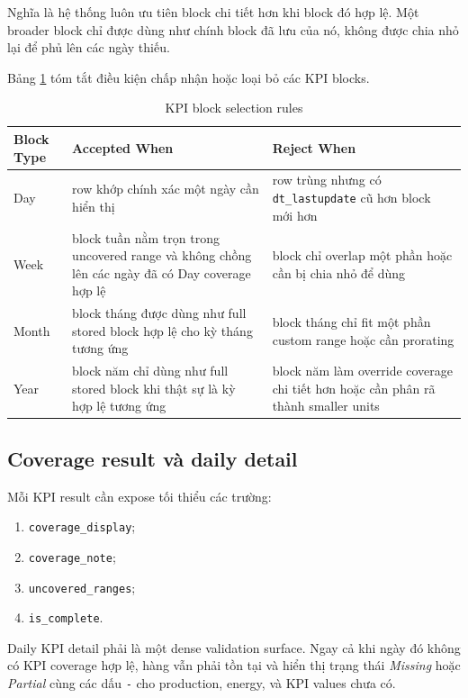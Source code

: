 Nghĩa là hệ thống luôn ưu tiên block chi tiết hơn khi block đó hợp lệ. Một broader block chỉ được dùng như chính block đã lưu của nó, không được chia nhỏ lại để phủ lên các ngày thiếu.

Bảng \ref{tab:kpi_block_rules} tóm tắt điều kiện chấp nhận hoặc loại bỏ các KPI blocks.

\begin{table}[htbp]
	\centering
	\renewcommand{\arraystretch}{1.3}
	\caption{KPI block selection rules}
	\label{tab:kpi_block_rules}
	\begin{tabularx}{\linewidth}{|>{\RaggedRight\arraybackslash}p{2.2cm}|>{\RaggedRight\arraybackslash}X|>{\RaggedRight\arraybackslash}X|}
		\hline
		\textbf{Block Type} & \textbf{Accepted When} & \textbf{Reject When} \\ \hline
		Day & row khớp chính xác một ngày cần hiển thị & row trùng nhưng có \texttt{dt\_lastupdate} cũ hơn block mới hơn \\ \hline
		Week & block tuần nằm trọn trong uncovered range và không chồng lên các ngày đã có Day coverage hợp lệ & block chỉ overlap một phần hoặc cần bị chia nhỏ để dùng \\ \hline
		Month & block tháng được dùng như full stored block hợp lệ cho kỳ tháng tương ứng & block tháng chỉ fit một phần custom range hoặc cần prorating \\ \hline
		Year & block năm chỉ dùng như full stored block khi thật sự là kỳ hợp lệ tương ứng & block năm làm override coverage chi tiết hơn hoặc cần phân rã thành smaller units \\ \hline
	\end{tabularx}
\end{table}

\subsection{Coverage result và daily detail}

Mỗi KPI result cần expose tối thiểu các trường:

\begin{enumerate}[label=-]
\item \texttt{coverage\_display};
\item \texttt{coverage\_note};
\item \texttt{uncovered\_ranges};
\item \texttt{is\_complete}.
\end{enumerate}

Daily KPI detail phải là một dense validation surface. Ngay cả khi ngày đó không có KPI coverage hợp lệ, hàng vẫn phải tồn tại và hiển thị trạng thái \textit{Missing} hoặc \textit{Partial} cùng các dấu \texttt{-} cho production, energy, và KPI values chưa có.

